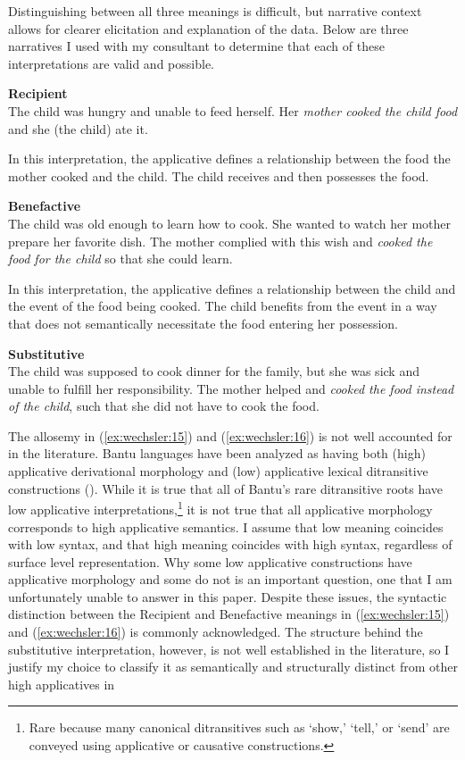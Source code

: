 \documentclass[output=paper,modfonts,nonflat,colorlinks,citecolor=brown]{langsci/langscibook}
\begin{document}
Distinguishing between all three meanings is difficult, but narrative context allows for clearer elicitation and explanation of the data. Below are three narratives I used with my consultant to determine that each of these interpretations are valid and possible. 


\ea\label{ex:wechsler:15}
\textbf{Recipient}\\
The child was hungry and unable to feed herself. Her \textit{mother cooked the child food} and she (the child) ate it.\\
\z

In this interpretation, the applicative defines a relationship between the food the mother cooked and the child. The child receives and then possesses the food. 


\ea\label{ex:wechsler:16}
\textbf{Benefactive}\\
The child was old enough to learn how to cook. She wanted to watch her mother prepare her favorite dish. The mother complied with this wish and \textit{cooked the food for the child} so that she could learn.\z

In this interpretation, the applicative defines a relationship between the child and the event of the food being cooked. The child benefits from the event in a way that does not semantically necessitate the food entering her possession. 


\ea\label{ex:wechsler:17}
\textbf{Substitutive}\\
The child was supposed to cook dinner for the family, but she was sick and unable to fulfill her responsibility. The mother helped and \textit{cooked the food instead of the child}, such that she did not have to cook the food.\\
\z

The allosemy in (\ref{ex:wechsler:15}) and (\ref{ex:wechsler:16}) is not well accounted for in the literature. Bantu languages have been analyzed as having both (high) applicative derivational morphology and (low) applicative lexical ditransitive constructions (\citealt{vanderWal2017}). While it is true that all of Bantu’s rare ditransitive roots have low applicative interpretations,\footnote{Rare because many canonical ditransitives such as ‘show,’ ‘tell,’ or ‘send’ are conveyed using applicative or causative constructions.}  it is not true that all applicative morphology corresponds to high applicative semantics. I assume that low meaning coincides with low syntax, and that high meaning coincides with high syntax, regardless of surface level representation. Why some low applicative constructions have applicative morphology and some do not is an important question, one that I am unfortunately unable to answer in this paper. Despite these issues, the syntactic distinction between the Recipient and Benefactive meanings in (\ref{ex:wechsler:15}) and (\ref{ex:wechsler:16}) is commonly acknowledged. The structure behind the substitutive interpretation, however, is not well established in the literature, so I justify my choice to classify it as semantically and structurally distinct from other high applicatives in  
\end{document}
